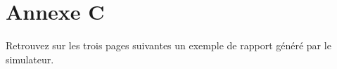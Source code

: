 \newpage
\part*{Annexe C}
\label{appendix:report}
Retrouvez sur les trois pages suivantes un exemple de rapport généré par le simulateur.
